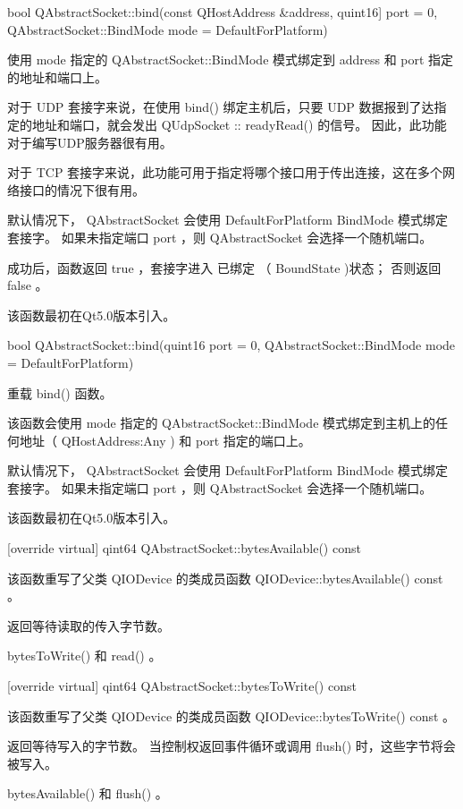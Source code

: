 \splitLine

bool QAbstractSocket::bind(const QHostAddress \&address, quint16] port
= 0, QAbstractSocket::BindMode mode = DefaultForPlatform)

使用 mode 指定的 QAbstractSocket::BindMode 模式绑定到 address 和 port 指定的地址和端口上。

对于 UDP 套接字来说，在使用 bind() 绑定主机后，只要 UDP 数据报到了达指定的地址和端口，就会发出 QUdpSocket :: readyRead() 的信号。 因此，此功能对于编写UDP服务器很有用。

对于 TCP 套接字来说，此功能可用于指定将哪个接口用于传出连接，这在多个网络接口的情况下很有用。

默认情况下， QAbstractSocket 会使用 DefaultForPlatform BindMode 模式绑定套接字。 如果未指定端口 port ，则 QAbstractSocket 会选择一个随机端口。

成功后，函数返回 true ，套接字进入 已绑定 （ BoundState )状态； 否则返回 false 。

该函数最初在Qt5.0版本引入。

bool QAbstractSocket::bind(quint16 port = 0, QAbstractSocket::BindMode
mode = DefaultForPlatform)

重载 bind() 函数。

该函数会使用 mode 指定的 QAbstractSocket::BindMode 模式绑定到主机上的任何地址（ QHostAddress:Any ) 和 port 指定的端口上。

默认情况下， QAbstractSocket 会使用 DefaultForPlatform BindMode 模式绑定套接字。 如果未指定端口 port ，则 QAbstractSocket 会选择一个随机端口。

该函数最初在Qt5.0版本引入。

[override virtual] qint64 QAbstractSocket::bytesAvailable() const

该函数重写了父类 QIODevice 的类成员函数 QIODevice::bytesAvailable() const 。

返回等待读取的传入字节数。


\begin{seeAlso}
bytesToWrite() 和 read() 。
\end{seeAlso}

[override virtual] qint64 QAbstractSocket::bytesToWrite() const

该函数重写了父类 QIODevice 的类成员函数 QIODevice::bytesToWrite() const 。

返回等待写入的字节数。 当控制权返回事件循环或调用 flush() 时，这些字节将会被写入。



\begin{seeAlso}
 bytesAvailable() 和 flush() 。
\end{seeAlso}

